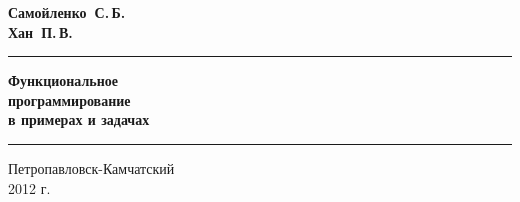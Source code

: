 \newcommand{\titlefont}{\color{red!30!black}\bfseries}

\begin{flushright}
\thispagestyle{empty}

\vspace{1cm}
\Large
\textbf{Самойленко~С.\,Б.}\\
\textbf{Хан~П.\,В.}
\normalfont

\vspace{2cm}

\hrule
\bigskip
           \HUGE\titlefont
            Функциональное\\
            программирование\\
            \huge\normalcolor\normalfont
            в примерах и задачах
\bigskip
\hrule
\vspace{2cm}
    

\vfill
\normalsize
Петропавловск-Камчатский\\
2012 г.

\end{flushright}
